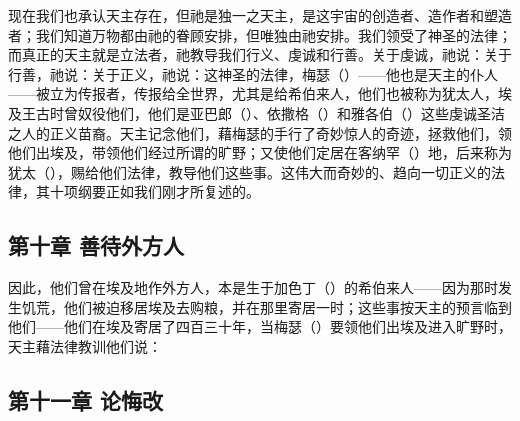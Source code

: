 现在我们也承认天主存在，但祂是独一之天主，是这宇宙的创造者、造作者和塑造者；我们知道万物都由祂的眷顾安排，但唯独由祂安排。我们领受了神圣的法律；而真正的天主就是立法者，祂教导我们行义、虔诚和行善。关于虔诚，祂说：关于行善，祂说：关于正义，祂说：这神圣的法律，梅瑟（）——他也是天主的仆人——被立为传报者，传报给全世界，尤其是给希伯来人，他们也被称为犹太人，埃及王古时曾奴役他们，他们是亚巴郎（）、依撒格（）和雅各伯（）这些虔诚圣洁之人的正义苗裔。天主记念他们，藉梅瑟的手行了奇妙惊人的奇迹，拯救他们，领他们出埃及，带领他们经过所谓的旷野；又使他们定居在客纳罕（）地，后来称为犹太（），赐给他们法律，教导他们这些事。这伟大而奇妙的、趋向一切正义的法律，其十项纲要正如我们刚才所复述的。\par


\subsection{第十章 善待外方人}

因此，他们曾在埃及地作外方人，本是生于加色丁（）的希伯来人——因为那时发生饥荒，他们被迫移居埃及去购粮，并在那里寄居一时；这些事按天主的预言临到他们——他们在埃及寄居了四百三十年，当梅瑟（）要领他们出埃及进入旷野时，天主藉法律教训他们说：\par


\subsection{第十一章 论悔改}

